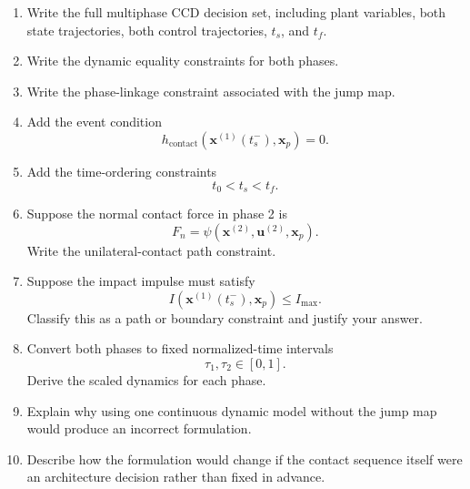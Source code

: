 \begin{enumerate}
    \item Write the full multiphase CCD decision set, including plant
    variables, both state trajectories, both control trajectories, $t_s$,
    and $t_f$.

    \item Write the dynamic equality constraints for both phases.

    \item Write the phase-linkage constraint associated with the jump map.

    \item Add the event condition
    \begin{equation}
    h_{\mathrm{contact}}
    \left(
    \mathbf{x}^{(1)}(t_s^-),
    \mathbf{x}_p
    \right)
    =
    0.
    \end{equation}

    \item Add the time-ordering constraints
    \begin{equation}
    t_0<t_s<t_f.
    \end{equation}

    \item Suppose the normal contact force in phase 2 is
    \begin{equation}
    F_n
    =
    \psi
    \left(
    \mathbf{x}^{(2)},
    \mathbf{u}^{(2)},
    \mathbf{x}_p
    \right).
    \end{equation}
    Write the unilateral-contact path constraint.

    \item Suppose the impact impulse must satisfy
    \begin{equation}
    I
    \left(
    \mathbf{x}^{(1)}(t_s^-),
    \mathbf{x}_p
    \right)
    \leq I_{\max}.
    \end{equation}
    Classify this as a path or boundary constraint and justify your answer.

    \item Convert both phases to fixed normalized-time intervals
    \begin{equation}
    \tau_1,\tau_2\in[0,1].
    \end{equation}
    Derive the scaled dynamics for each phase.

    \item Explain why using one continuous dynamic model without the jump
    map would produce an incorrect formulation.

    \item Describe how the formulation would change if the contact sequence
    itself were an architecture decision rather than fixed in advance.
\end{enumerate}
